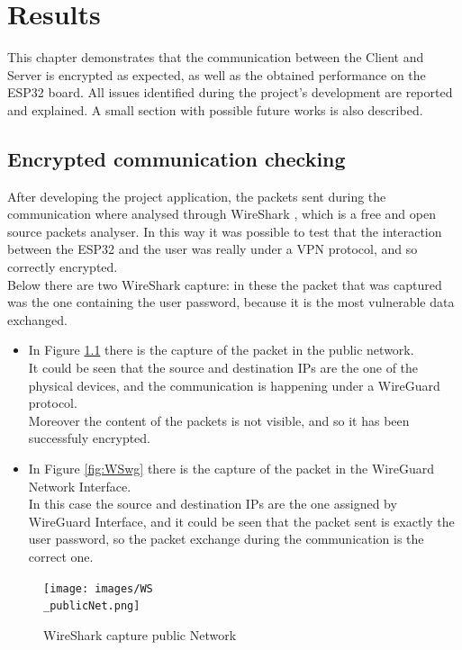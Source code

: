 \chapter{Results}
This chapter demonstrates that the communication between the Client and Server is encrypted as expected, as well as the obtained performance on the ESP32 board.
All issues identified during the project's development are reported and explained. A small section with possible future works is also described.    

\section{Encrypted communication checking}
After developing the project application, the packets sent during the communication where analysed through WireShark \cite{WireShark}, which is a free and open source packets analyser.
In this way it was possible to test that the interaction between the ESP32 and the user was really under a VPN protocol, and so correctly encrypted.\\
Below there are two WireShark capture: in these the packet that was captured was the one containing the user password, because it is the most vulnerable data exchanged.

\begin{itemize}
    \item In Figure \ref{fig:WSpublic} there is the capture of the packet in the public network.\\It could be seen that the source and destination IPs are the one of the physical devices, and the communication is happening under a WireGuard protocol.\\Moreover the content of the packets is not visible, and so it has been successfuly encrypted.
    \item In Figure \ref{fig:WSwg} there is the capture of the packet in the WireGuard Network Interface.\\In this case the source and destination IPs are the one assigned by WireGuard Interface, and it could be seen that the packet sent is exactly the user password, so the packet exchange during the communication is the correct one.\\
\end{itemize}

\begin{figure}[H]
    \centering
    \vspace{0.5cm}
    \texttt{[image: images/WS\\\_publicNet.png]}
    \caption{WireShark capture public Network}
    \label{fig:WSpublic} %
\end{figure}

